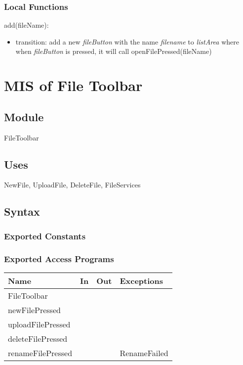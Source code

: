 \documentclass[12pt, titlepage]{article}
\begin{document}
	\subsubsection{Local Functions}
	
	\noindent add(fileName):
	\begin{itemize}
		\item transition: add a new \textit{fileButton} with the name \textit{filename} to \textit{listArea} where when \textit{fileButton} is pressed, it will call openFilePressed(fileName) \\
	\end{itemize}
	
	\newpage
	
	\section{MIS of File Toolbar} \label{Module} 
	
	\subsection{Module}
	
	FileToolbar
	
	\subsection{Uses}
	NewFile, UploadFile, DeleteFile, FileServices
	
	\subsection{Syntax}
	
	\subsubsection{Exported Constants}
	
	\subsubsection{Exported Access Programs}
	
	\begin{center}
		\begin{tabular}{p{4cm} p{2cm} p{2cm} p{4cm}}
			\hline
			\textbf{Name} & \textbf{In} & \textbf{Out} & \textbf{Exceptions} \\
			\hline
			FileToolbar  & ~ &  & ~ \\
			\hline
			newFilePressed & ~ & ~ & ~ \\
			\hline
			uploadFilePressed & ~ & ~ & ~ \\
			\hline
			deleteFilePressed & ~ & ~ & ~ \\
			\hline
			renameFilePressed & ~ & ~ & RenameFailed \\
			\hline
		\end{tabular}
	\end{center}
	
\end{document}
